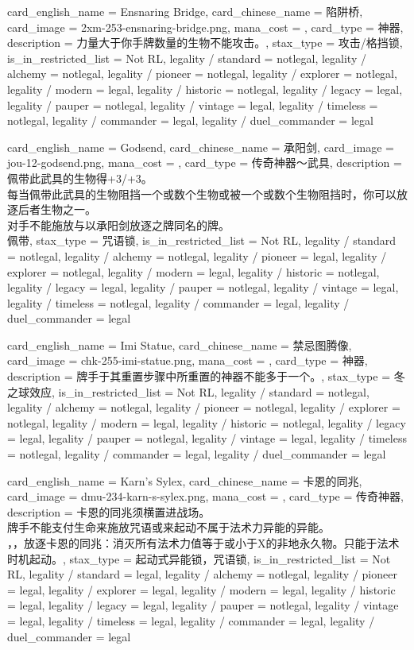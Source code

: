 \documentclass[lang = cn, color = black, 10pt]{AllThatStax}
\begin{document}
\card
{
	card_english_name = {Ensnaring Bridge},
	card_chinese_name = {陷阱桥},
	card_image = 2xm-253-ensnaring-bridge.png,
	mana_cost = ,
	card_type = 神器,
	description = {力量大于你手牌数量的生物不能攻击。},
	stax_type = 攻击/格挡锁,
	is_in_restricted_list = Not RL,
	legality / standard = notlegal,
	legality / alchemy = notlegal,
	legality / pioneer = notlegal,
	legality / explorer = notlegal,
	legality / modern = legal,
	legality / historic = notlegal,
	legality / legacy = legal,
	legality / pauper = notlegal,
	legality / vintage = legal,
	legality / timeless = notlegal,
	legality / commander = legal,
	legality / duel_commander = legal
}

\card
{
	card_english_name = {Godsend},
	card_chinese_name = {承阳剑},
	card_image = jou-12-godsend.png,
	mana_cost = ,
	card_type = 传奇神器～武具,
	description = {佩带此武具的生物得+3/+3。\\
每当佩带此武具的生物阻挡一个或数个生物或被一个或数个生物阻挡时，你可以放逐后者生物之一。\\
对手不能施放与以承阳剑放逐之牌同名的牌。\\
佩带},
	stax_type = 咒语锁,
	is_in_restricted_list = Not RL,
	legality / standard = notlegal,
	legality / alchemy = notlegal,
	legality / pioneer = legal,
	legality / explorer = notlegal,
	legality / modern = legal,
	legality / historic = notlegal,
	legality / legacy = legal,
	legality / pauper = notlegal,
	legality / vintage = legal,
	legality / timeless = notlegal,
	legality / commander = legal,
	legality / duel_commander = legal
}

\card
{
	card_english_name = {Imi Statue},
	card_chinese_name = {禁忌图腾像},
	card_image = chk-255-imi-statue.png,
	mana_cost = ,
	card_type = 神器,
	description = {牌手于其重置步骤中所重置的神器不能多于一个。},
	stax_type = 冬之球效应,
	is_in_restricted_list = Not RL,
	legality / standard = notlegal,
	legality / alchemy = notlegal,
	legality / pioneer = notlegal,
	legality / explorer = notlegal,
	legality / modern = legal,
	legality / historic = notlegal,
	legality / legacy = legal,
	legality / pauper = notlegal,
	legality / vintage = legal,
	legality / timeless = notlegal,
	legality / commander = legal,
	legality / duel_commander = legal
}

\card
{
	card_english_name = {Karn's Sylex},
	card_chinese_name = {卡恩的同兆},
	card_image = dmu-234-karn-s-sylex.png,
	mana_cost = ,
	card_type = 传奇神器,
	description = {卡恩的同兆须横置进战场。\\
牌手不能支付生命来施放咒语或来起动不属于法术力异能的异能。\\
，，放逐卡恩的同兆：消灭所有法术力值等于或小于X的非地永久物。只能于法术时机起动。},
	stax_type = 起动式异能锁，咒语锁,
	is_in_restricted_list = Not RL,
	legality / standard = legal,
	legality / alchemy = notlegal,
	legality / pioneer = legal,
	legality / explorer = legal,
	legality / modern = legal,
	legality / historic = legal,
	legality / legacy = legal,
	legality / pauper = notlegal,
	legality / vintage = legal,
	legality / timeless = legal,
	legality / commander = legal,
	legality / duel_commander = legal
}
\end{document}
